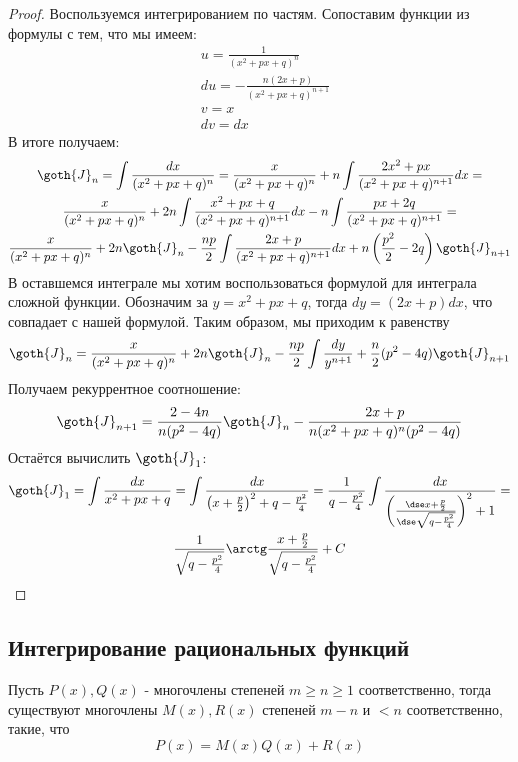 \begin{proof}
	Воспользуемся интегрированием по частям. Сопоставим функции из формулы с тем, что мы имеем:
	\begin{align*}
		&{u = \frac{1}{(x^2 + px + q)^n}}
		\\
		&{du = -\frac{n(2x + p)}{(x^2 + px + q)^{n + 1}}}
		\\
		&{v = x}
		\\
		&{dv = dx}
	\end{align*}
	В итоге получаем:
	\begin{multline*}
		\goth{J}_n = \int \frac{dx}{(x^2 + px + q)^n} = \frac{x}{(x^2 + px + q)^n} + n\int \frac{2x^2 + px}{(x^2 + px + q)^{n + 1}}dx =
		\\
		\frac{x}{(x^2 + px + q)^n} + 2n\int \frac{x^2 + px + q}{(x^2 + px + q)^{n + 1}}dx - n\int \frac{px + 2q}{(x^2 + px + q)^{n + 1}} =
		\\
		\frac{x}{(x^2 + px + q)^n} + 2n\goth{J}_n - \frac{np}{2}\int \frac{2x + p}{(x^2 + px + q)^{n + 1}}dx + n\left(\frac{p^2}{2} - 2q\right) \goth{J}_{n + 1}
	\end{multline*}
	В оставшемся интеграле мы хотим воспользоваться формулой для интеграла сложной функции. Обозначим за $y = x^2 + px + q$, тогда $dy = (2x + p)dx$, что совпадает с нашей формулой. Таким образом, мы приходим к равенству
	\[
		\goth{J}_n = \frac{x}{(x^2 + px + q)^n} + 2n\goth{J}_n - \frac{np}{2}\int \frac{dy}{y^{n + 1}} + \frac{n}{2}(p^2 - 4q)\goth{J}_{n + 1}
	\]
	Получаем рекуррентное соотношение:
	\[
		\goth{J}_{n + 1} = \frac{2 - 4n}{n(p^2 - 4q)}\goth{J}_n - \frac{2x + p}{n(x^2 + px + q)^n(p^2 - 4q)}
	\]
	Остаётся вычислить $\goth{J}_1$:
	\begin{multline*}
		\goth{J}_1 = \int \frac{dx}{x^2 + px + q} = \int \frac{dx}{\left(x + \frac{p}{2}\right)^2 + q - \frac{p^2}{4}} = \frac{1}{q - \frac{p^2}{4}} \int \frac{dx}{\left(\frac{\dse x + \frac{p}{2}}{\dse \sqrt{q - \frac{p^2}{4}}}\right)^2 + 1} =
		\\
		\frac{1}{\sqrt{q - \frac{p^2}{4}}} \arctg \frac{x + \frac{p}{2}}{\sqrt{q - \frac{p^2}{4}}} + C
	\end{multline*}
\end{proof}

\subsection{Интегрирование рациональных функций}

\begin{lemma}
	Пусть $P(x), Q(x)$ - многочлены степеней $m \ge n \ge 1$ соответственно, тогда существуют многочлены $M(x), R(x)$ степеней $m - n$ и $< n$ соответственно, такие, что
	\[
		P(x) = M(x)Q(x) + R(x)
	\]
\end{lemma}

